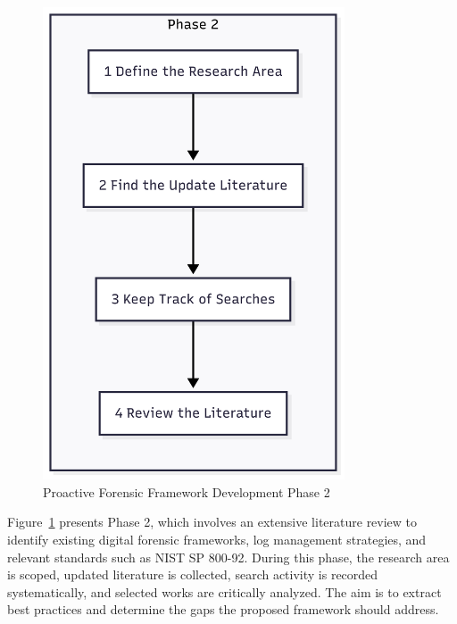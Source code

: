 \begin{figure}[H]
    \centering
    \includegraphics[height=14cm]{figure/framework-development-phase-2.png}
    \caption{Proactive Forensic Framework Development Phase 2}
    \label{fig:framework-development-phase-2}
\end{figure}
Figure~\ref{fig:framework-development-phase-2} presents Phase 2, which involves an extensive literature review to identify existing digital forensic frameworks, log management strategies, and relevant standards such as NIST SP 800-92. During this phase, the research area is scoped, updated literature is collected, search activity is recorded systematically, and selected works are critically analyzed. The aim is to extract best practices and determine the gaps the proposed framework should address.


